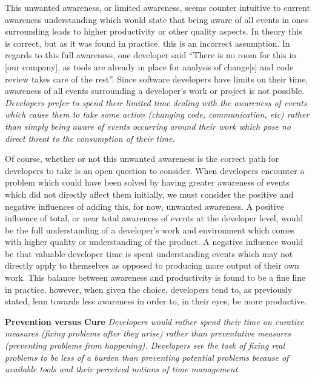 This unwanted awareness, or limited awareness, seems counter intuitive to current awareness understanding which would state that
being aware of all events in ones surrounding leads to higher productivity or other quality aspects. In theory this is correct,
but as it was found in practice, this is an incorrect assumption. 
In regards to this full awareness, one developer said ``There is no room for this in [our company], as tools are already in place for 
analysis of change[s] and code review takes care of the rest''. Since software developers have limits on their time, awareness of
all events surrounding a developer's work or project is not possible. \textit{Developers prefer to spend their limited time dealing with
the awareness of events which cause them to take some action (changing code, communication, etc) rather than simply being aware
of events occurring around their work which pose no direct threat to the consumption of their time.}

Of course, whether or not this unwanted awareness is the correct path for developers to take is an open question to consider. When
developers encounter a problem which could have been solved by having greater awareness of events which did not directly affect
them initially, we must consider the positive and negative influences of adding this, for now, unwanted awareness. A positive
influence of total, or near total
awareness of events at the developer level, would be the full understanding of a developer's work and environment which comes
with higher quality or understanding of the product. 
A negative influence would be that valuable developer time is spent understanding events which may not directly apply to themselves as opposed to 
producing more output of their own work. This balance between awareness and productivity is found to be a fine line in practice,
however, when given the choice, developers tend to, as previously stated, lean towards less awareness in order to, in their eyes,
be more productive.

\textbf{Prevention versus Cure}  \textit{Developers would rather spend their time on curative measures (fixing problems after they
arise) rather than preventative measures (preventing problems from happening). Developers see the task of fixing real problems
to be less of a burden than preventing potential problems because of available tools and their perceived notions of time management.}

